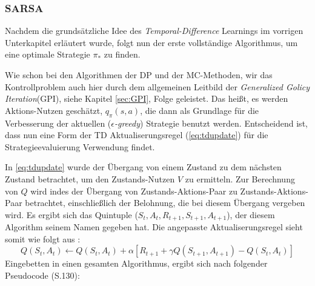 \subsubsection{SARSA}
Nachdem die grundsätzliche Idee des \textit{Temporal-Difference} Learnings im vorrigen Unterkapitel erläutert wurde, folgt nun der erste vollständige Algorithmus, um eine optimale Strategie $\pi_*$ zu finden.
\par 
Wie schon bei den Algorithmen der DP und der MC-Methoden, wir das Kontrollproblem auch hier durch dem allgemeinen Leitbild der \textit{Generalized Golicy Iteration}(GPI), siehe Kapitel \ref{sec:GPI}, Folge geleistet. Das heißt, es werden Aktions-Nutzen geschätzt, $q_\pi(s,a)$, die dann als Grundlage für die Verbesserung der aktuellen ($\epsilon$\textit{-greedy}) Strategie benutzt werden. Entscheidend ist, dass nun eine Form der TD Aktualiserungsregel (\ref{eq:tdupdate}) für die Strategieevaluierung Verwendung findet.
\par 
In \ref{eq:tdupdate} wurde der Übergang von einem Zustand zu dem nächsten Zustand betrachtet, um den Zustands-Nutzen $V$ zu ermitteln. Zur Berechnung von $Q$ wird indes der Übergang von Zustands-Aktions-Paar zu Zustands-Aktions-Paar betrachtet, einschließlich der Belohnung, die bei diesem Übergang vergeben wird. Es ergibt sich das Quintuple ($S_t, A_t, R_{t+1}, S_{t+1}, A_{t+1}$), der diesem Algorithm seinem Namen gegeben hat. Die angepasste Aktualiserungsregel sieht somit wie folgt aus \cite[S.~129]{Sutton1998}:
\begin{equation}
    Q(S_t, A_t) \gets Q(S_t, A_t) + \alpha \left[R_{t+1} + \gamma Q(S_{t+1}, A_{t+1}) - Q(S_t, A_t)\right]
\end{equation}
Eingebetten in einen gesamten Algorithmus, ergibt sich nach \cite{Sutton1998} folgender Pseudocode (S.130): 
\pagebreak


